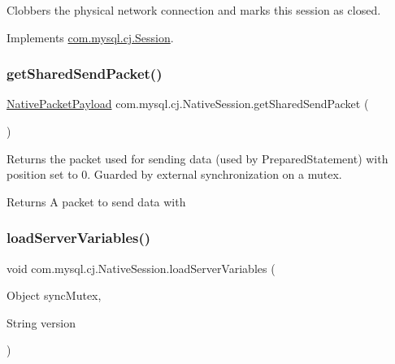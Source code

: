 Clobbers the physical network connection and marks this session as closed. 

Implements \mbox{\hyperlink{interfacecom_1_1mysql_1_1cj_1_1_session_a4394068e5b6e4534ae8d2d90ea4be2c6}{com.\+mysql.\+cj.\+Session}}.

\mbox{\label{classcom_1_1mysql_1_1cj_1_1_native_session_a992bfbb8f5cd5ba3bddcc850691ce4e3}} 
\subsubsection{\texorpdfstring{get\+Shared\+Send\+Packet()}{getSharedSendPacket()}}
{\footnotesize\ttfamily \mbox{\hyperlink{classcom_1_1mysql_1_1cj_1_1protocol_1_1a_1_1_native_packet_payload}{Native\+Packet\+Payload}} com.\+mysql.\+cj.\+Native\+Session.\+get\+Shared\+Send\+Packet (\begin{DoxyParamCaption}{ }\end{DoxyParamCaption})}

Returns the packet used for sending data (used by Prepared\+Statement) with position set to 0. Guarded by external synchronization on a mutex.

\begin{DoxyReturn}{Returns}
A packet to send data with 
\end{DoxyReturn}
\mbox{\label{classcom_1_1mysql_1_1cj_1_1_native_session_af9eebdf7b6270a82f07d2cb4c2566ca6}} 
\subsubsection{\texorpdfstring{load\+Server\+Variables()}{loadServerVariables()}}
{\footnotesize\ttfamily void com.\+mysql.\+cj.\+Native\+Session.\+load\+Server\+Variables (\begin{DoxyParamCaption}\item[{Object}]{sync\+Mutex,  }\item[{String}]{version }\end{DoxyParamCaption})}

